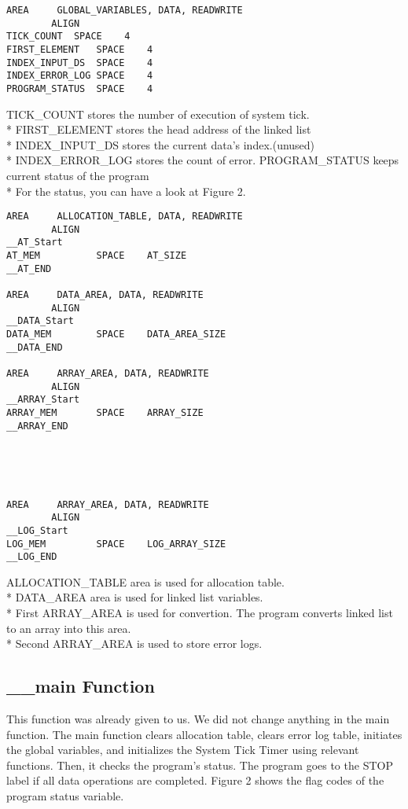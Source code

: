 \documentclass[pdftex,12pt,a4paper]{article}
\begin{document}
\begin{lstlisting}
AREA     GLOBAL_VARIABLES, DATA, READWRITE		
		ALIGN	
TICK_COUNT	SPACE	 4	
FIRST_ELEMENT  	SPACE    4
INDEX_INPUT_DS  SPACE    4
INDEX_ERROR_LOG SPACE	 4
PROGRAM_STATUS  SPACE    4
\end{lstlisting}
TICK\_COUNT stores the number of execution of system tick.\\*
FIRST\_ELEMENT stores the head address of the linked list\\*
INDEX\_INPUT\_DS stores the current data's index.(unused)\\*
INDEX\_ERROR\_LOG stores the count of error.
PROGRAM\_STATUS keeps current status of the program\\* For the status, you can have a look at Figure 2. 
\begin{lstlisting}
AREA     ALLOCATION_TABLE, DATA, READWRITE		
		ALIGN	
__AT_Start
AT_MEM       	SPACE    AT_SIZE
__AT_END

AREA     DATA_AREA, DATA, READWRITE		
		ALIGN	
__DATA_Start
DATA_MEM        SPACE    DATA_AREA_SIZE
__DATA_END

AREA     ARRAY_AREA, DATA, READWRITE		
		ALIGN	
__ARRAY_Start
ARRAY_MEM       SPACE    ARRAY_SIZE
__ARRAY_END





AREA     ARRAY_AREA, DATA, READWRITE		
		ALIGN	
__LOG_Start
LOG_MEM       	SPACE    LOG_ARRAY_SIZE
__LOG_END
\end{lstlisting}
ALLOCATION\_TABLE area is used for allocation table.\\*
DATA\_AREA area is used for linked list variables. \\*
First ARRAY\_AREA is used for convertion. The program converts linked list to an array into this area.\\*
Second ARRAY\_AREA is used to store error logs.
\subsection{\_\_main Function}

This function was already given to us. We did not change anything in the main function. The  main  function  clears  allocation  table, clears  error  log  table, initiates the  global  variables,  and initializes the System Tick Timer using relevant functions. Then, it checks the program’s status. The program goes to the STOP label if all data operations are completed. Figure 2 shows the flag codes of the program status variable.
\end{document}
